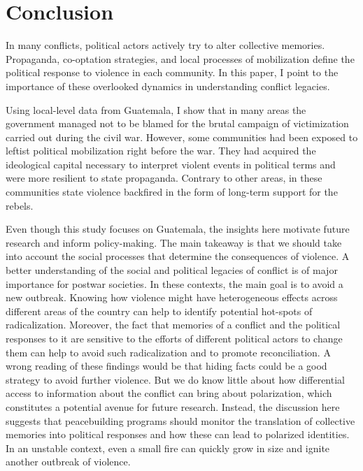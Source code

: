 \documentclass[12pt, notitlepage]{article}
\begin{document}

\section*{Conclusion}

In many conflicts, political actors actively try to alter collective memories.
Propaganda, co-optation strategies, and local processes of mobilization define the political response to violence in each community.
In this paper, I point to the importance of these overlooked dynamics in understanding conflict legacies.

Using local-level data from Guatemala, I show that in many areas the government managed not to be blamed for the brutal campaign of victimization carried out during the civil war.
However, some communities had been exposed to leftist political mobilization right before the war.
They had acquired the ideological capital necessary to interpret violent events in political terms and were more resilient to state propaganda.
Contrary to other areas, in these communities state violence backfired in the form of long-term support for the rebels.

Even though this study focuses on Guatemala, the insights here motivate future research and inform policy-making.
The main takeaway is that we should take into account the social processes that determine the consequences of violence.
A better understanding of the social and political legacies of conflict is of major importance for postwar societies.
In these contexts, the main goal is to avoid a new outbreak.
Knowing how violence might have heterogeneous effects across different areas of the country can help to identify potential hot-spots of radicalization.
Moreover, the fact that memories of a conflict and the political responses to it are sensitive to the efforts of different political actors to change them can help to avoid such radicalization and to promote reconciliation.
A wrong reading of these findings would be that hiding facts could be a good strategy to avoid further violence.
But we do know little about how differential access to information about the conflict can bring about polarization, which constitutes a potential avenue for future research.
Instead, the discussion here suggests that peacebuilding programs should monitor the translation of collective memories into political responses and how these can lead to polarized identities.
In an unstable context, even a small fire can quickly grow in size and ignite another outbreak of violence.

\clearpage



% 
\end{document}
